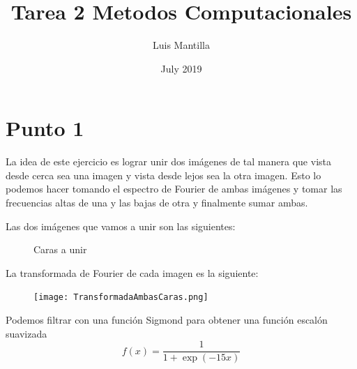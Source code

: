 \documentclass{article}
\title{Tarea 2 Metodos Computacionales}
\author{Luis Mantilla}
\date{July 2019}
\begin{document}
\maketitle

\section*{Punto 1}

La idea de este ejercicio es lograr unir dos im\'agenes de tal manera que vista desde cerca sea una imagen y vista desde lejos sea la otra imagen. Esto lo podemos hacer tomando el espectro de Fourier de ambas im\'agenes y tomar las frecuencias altas de una y las bajas de otra y finalmente sumar ambas.


Las dos im\'agenes que vamos a unir son las siguientes:
\begin{figure}[!htbp]
  \centering
  \hspace{0.2cm}
  \caption{Caras a unir}
\end{figure}


La transformada de Fourier de cada imagen es la siguiente:
\begin{figure}[!htbp]
 \centering
  \texttt{[image: TransformadaAmbasCaras.png]}
\end{figure}

Podemos filtrar con una función Sigmond para obtener una funci\'on escal\'on suavizada
\begin{equation*}
    f(x) = \frac{1}{1+ \exp(-15x)}
\end{equation*}
\end{document}
